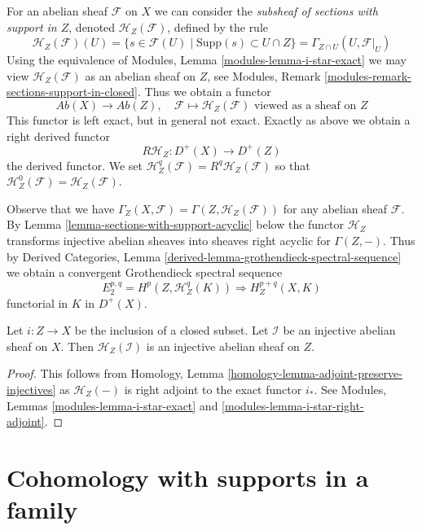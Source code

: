 \medskip\noindent
For an abelian sheaf $\mathcal{F}$ on $X$ we can consider the
{\it subsheaf of sections with support in $Z$}, denoted
$\mathcal{H}_Z(\mathcal{F})$, defined by the rule
$$
\mathcal{H}_Z(\mathcal{F})(U) =
\{s \in \mathcal{F}(U) \mid \text{Supp}(s) \subset U \cap Z\} =
\Gamma_{Z \cap U}(U, \mathcal{F}|_U)
$$
Using the equivalence of Modules, Lemma \ref{modules-lemma-i-star-exact}
we may view $\mathcal{H}_Z(\mathcal{F})$ as an abelian sheaf on $Z$, see
Modules, Remark \ref{modules-remark-sections-support-in-closed}.
Thus we obtain a functor
$$
\textit{Ab}(X) \longrightarrow \textit{Ab}(Z),\quad
\mathcal{F} \longmapsto
\mathcal{H}_Z(\mathcal{F})\text{ viewed as a sheaf on }Z
$$
This functor is left exact, but in general not exact. Exactly as above
we obtain a right derived functor
$$
R\mathcal{H}_Z : D^+(X) \longrightarrow D^+(Z)
$$
the derived functor. We set
$\mathcal{H}^q_Z(\mathcal{F}) = R^q\mathcal{H}_Z(\mathcal{F})$ so that
$\mathcal{H}^0_Z(\mathcal{F}) = \mathcal{H}_Z(\mathcal{F})$.

\medskip\noindent
Observe that we have
$\Gamma_Z(X, \mathcal{F}) = \Gamma(Z, \mathcal{H}_Z(\mathcal{F}))$
for any abelian sheaf $\mathcal{F}$. By
Lemma \ref{lemma-sections-with-support-acyclic} below
the functor $\mathcal{H}_Z$ transforms injective abelian sheaves
into sheaves right acyclic for $\Gamma(Z, -)$. Thus by
Derived Categories, Lemma \ref{derived-lemma-grothendieck-spectral-sequence}
we obtain a convergent Grothendieck spectral sequence
$$
E_2^{p, q} = H^p(Z, \mathcal{H}^q_Z(K)) \Rightarrow H^{p + q}_Z(X, K)
$$
functorial in $K$ in $D^+(X)$.

\begin{lemma}
\label{lemma-sections-with-support-acyclic}
Let $i : Z \to X$ be the inclusion of a closed subset.
Let $\mathcal{I}$ be an injective abelian sheaf on $X$.
Then $\mathcal{H}_Z(\mathcal{I})$ is an injective abelian sheaf on $Z$.
\end{lemma}

\begin{proof}
This follows from
Homology, Lemma \ref{homology-lemma-adjoint-preserve-injectives}
as $\mathcal{H}_Z(-)$ is right adjoint to the exact functor $i_*$.
See Modules, Lemmas \ref{modules-lemma-i-star-exact} and
\ref{modules-lemma-i-star-right-adjoint}.
\end{proof}




\section{Cohomology with supports in a family}
\label{section-cohomology-family-supports}

